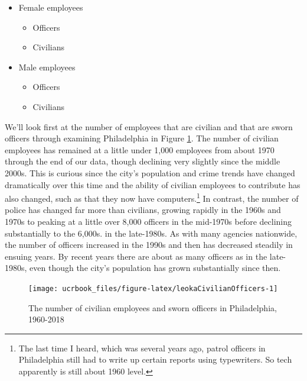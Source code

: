 \documentclass[
  12pt,
  openany]{book}
\providecommand{\tightlist}{%
  \setlength{\itemsep}{0pt}\setlength{\parskip}{0pt}}
\begin{document}
\begin{itemize}
\tightlist
\item
  Female employees

  \begin{itemize}
  \tightlist
  \item
    Officers
  \item
    Civilians
  \end{itemize}
\item
  Male employees

  \begin{itemize}
  \tightlist
  \item
    Officers
  \item
    Civilians
  \end{itemize}
\end{itemize}

We'll look first at the number of employees that are civilian and that are sworn officers through examining Philadelphia in Figure \ref{fig:leokaCivilianOfficers}. The number of civilian employees has remained at a little under 1,000 employees from about 1970 through the end of our data, though declining very slightly since the middle 2000s. This is curious since the city's population and crime trends have changed dramatically over this time and the ability of civilian employees to contribute has also changed, such as that they now have computers.\footnote{The last time I heard, which was several years ago, patrol officers in Philadelphia still had to write up certain reports using typewriters. So tech apparently is still about 1960 level.} In contrast, the number of police has changed far more than civilians, growing rapidly in the 1960s and 1970s to peaking at a little over 8,000 officers in the mid-1970s before declining substantially to the 6,000s. in the late-1980s. As with many agencies nationwide, the number of officers increased in the 1990s and then has decreased steadily in ensuing years. By recent years there are about as many officers as in the late-1980s, even though the city's population has grown substantially since then.

\begin{figure}

{\centering \texttt{[image: ucrbook\_files/figure-latex/leokaCivilianOfficers-1]} 

}

\caption{The number of civilian employees and sworn officers in Philadelphia, 1960-2018}\label{fig:leokaCivilianOfficers}
\end{figure}
\end{document}
